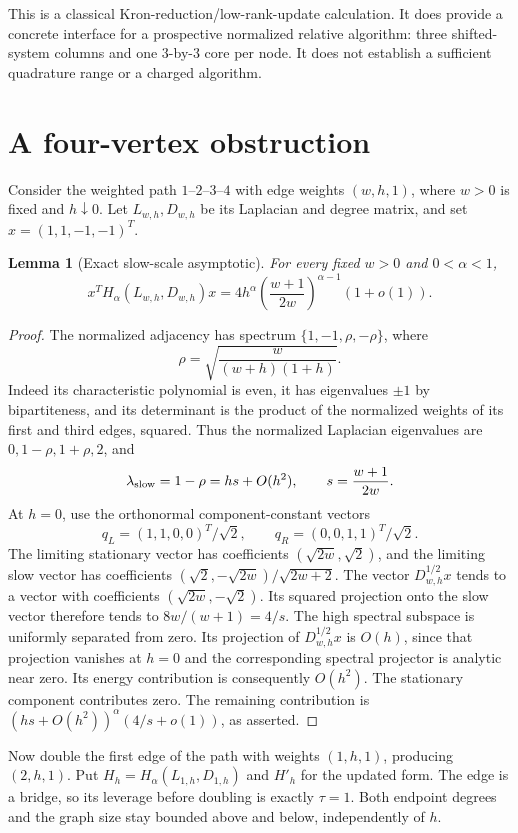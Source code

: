 \documentclass[11pt]{article}
\newtheorem{lemma}{Lemma}
\begin{document}
This is a classical Kron-reduction/low-rank-update calculation. It does
provide a concrete interface for a prospective normalized relative
algorithm: three shifted-system columns and one $3$-by-$3$ core per node.
It does not establish a sufficient quadrature range or a charged algorithm.

\section{A four-vertex obstruction}
Consider the weighted path $1$--$2$--$3$--$4$ with edge weights
$(w,h,1)$, where $w>0$ is fixed and $h\downarrow0$. Let
$L_{w,h},D_{w,h}$ be its Laplacian and degree matrix, and set
$x=(1,1,-1,-1)^T$.

\begin{lemma}[Exact slow-scale asymptotic]\label{lem:slow}
For every fixed $w>0$ and $0<\alpha<1$,
\[
 x^TH_\alpha(L_{w,h},D_{w,h})x
 =4h^\alpha\left(\frac{w+1}{2w}\right)^{\alpha-1}(1+o(1)).
\]
\end{lemma}
\begin{proof}
The normalized adjacency has spectrum $\{1,-1,\rho,-\rho\}$, where
\[
 \rho=\sqrt{\frac{w}{(w+h)(1+h)}}.
\]
Indeed its characteristic polynomial is even, it has eigenvalues
$\pm1$ by bipartiteness, and its determinant is the product of the
normalized weights of its first and third edges, squared. Thus the
normalized Laplacian eigenvalues are $0,1-\rho,1+\rho,2$, and
\[
 \lambda_{\rm slow}=1-\rho
 =h s+O(h^2),\qquad s=\frac{w+1}{2w}.
\]
At $h=0$, use the orthonormal component-constant vectors
\[
 q_L=(1,1,0,0)^T/\sqrt2,\qquad
 q_R=(0,0,1,1)^T/\sqrt2.
\]
The limiting stationary vector has coefficients $(\sqrt{2w},\sqrt2)$,
and the limiting slow vector has coefficients
$(\sqrt2,-\sqrt{2w})/\sqrt{2w+2}$. The vector
$D_{w,h}^{1/2}x$ tends to a vector with coefficients
$(\sqrt{2w},-\sqrt2)$. Its squared projection onto the slow vector
therefore tends to $8w/(w+1)=4/s$.
The high spectral subspace is uniformly separated from zero. Its
projection of $D_{w,h}^{1/2}x$ is $O(h)$, since that projection
vanishes at $h=0$ and the corresponding spectral projector is analytic
near zero. Its energy contribution is consequently $O(h^2)$.
The stationary component contributes zero. The remaining contribution
is $(hs+O(h^2))^\alpha(4/s+o(1))$, as asserted.
\end{proof}

Now double the first edge of the path with weights $(1,h,1)$, producing
$(2,h,1)$. Put $H_h=H_\alpha(L_{1,h},D_{1,h})$ and $H'_h$ for the
updated form. The edge is a bridge, so its leverage before doubling is
exactly $\tau=1$. Both endpoint degrees and the graph size stay bounded
above and below, independently of $h$.
\end{document}
